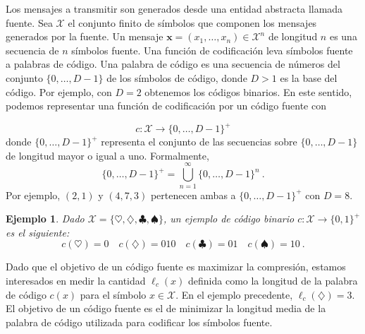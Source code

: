 \documentclass[11pt]{article}
\newtheorem{example}[theorem]{Ejemplo}
\newcommand{\bx}{ \boldsymbol{x} }
\newcommand{\scX}{\mathcal{X}}
\begin{document}
\begin{center}
\end{center}

\bigskip

Los mensajes a transmitir son generados desde una entidad abstracta llamada fuente. Sea $\scX$ el conjunto finito de símbolos que componen los mensajes generados por la fuente. Un mensaje $\bx = (x_1,\dots,x_n) \in \scX^n$ de longitud $n$ es una secuencia de $n$ símbolos fuente. Una función de codificación leva símbolos fuente a palabras de código. Una palabra de código es una secuencia de números del conjunto $\{0,\dots,D-1\}$ de los símbolos de código, donde $D > 1$ es la base del código. Por ejemplo, con $D=2$ obtenemos los códigos binarios. En este sentido, podemos representar una función de codificación por un código fuente con

\[
    c : \scX \to \{0,\dots,D-1\}^+
\]
donde $\{0,\dots,D-1\}^+$ representa el conjunto de las secuencias sobre $\{0,\dots,D-1\}$ de longitud mayor o igual a uno. Formalmente,
\[
    \{0,\dots,D-1\}^+ = \bigcup_{n=1}^{\infty} \{0,\dots,D-1\}^n~.
\]
Por ejemplo, $(2,1)$ y $(4,7,3)$ pertenecen ambas a $\{0,\dots,D-1\}^+$ con $D=8$.
%
\begin{example}
\label{ex:1}
Dado $\scX = \{\heartsuit,\diamondsuit,\clubsuit,\spadesuit\}$, un ejemplo de código binario $c : \scX\to\{0,1\}^+$ es el siguiente:
\[
    c(\heartsuit) = 0 \quad c(\diamondsuit) = 010 \quad c(\clubsuit) = 01 \quad c(\spadesuit) = 10~.
\]
\end{example}
%
Dado que el objetivo de un código fuente es maximizar la compresión, estamos interesados en medir la cantidad $\ell_c(x)$ definida como la longitud de la palabra de código $c(x)$ para el símbolo $x\in\scX$. En el ejemplo precedente, $\ell_c(\diamondsuit) = 3$.
El objetivo de un código fuente es el de minimizar la longitud media de la palabra de código utilizada para codificar los símbolos fuente.
\end{document}
